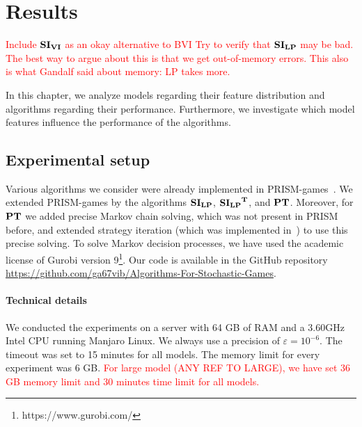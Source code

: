 \chapter{Results} \label{ch:results}

\textcolor{red}{Include $\mathbf{SI_{VI}}$ as an okay alternative to BVI}
\textcolor{red}{Try to verify that $\mathbf{SI_{LP}}$ may be bad. The best way to argue about this is that we get out-of-memory errors. This also is what Gandalf said about memory: LP takes more.}

In this chapter, we analyze models regarding their feature distribution and algorithms regarding their performance.
Furthermore, we investigate which model features influence the performance of the algorithms.



\section{Experimental setup}
Various algorithms we consider were already implemented in PRISM-games~\cite{prismgames3}.
We extended PRISM-games by the algorithms $\mathbf{SI_{LP}}$, $\mathbf{\mathbf{SI_{LP}}^T}$, and $\mathbf{PT}$.
Moreover, for $\mathbf{PT}$ we added precise Markov chain solving, which was not present in PRISM before, and extended strategy iteration (which was implemented in~\cite{gandalf}) to use this precise solving.
To solve Markov decision processes, we have used the academic license of Gurobi version 9\footnote{https://www.gurobi.com/}. 
Our code is available in the GitHub repository \url{https://github.com/ga67vib/Algorithms-For-Stochastic-Games}.

\subsubsection*{Technical details}
We conducted the experiments on a server with 64 GB of RAM and a 3.60GHz Intel CPU running Manjaro Linux. %
We always use a precision of $\varepsilon=10^{-6}$. The timeout was set to 15 minutes for all models. 
The memory limit for every experiment was 6 GB.
\textcolor{red}{For large model (ANY REF TO LARGE), we have set 36 GB memory limit and 30 minutes time limit for all models.}


